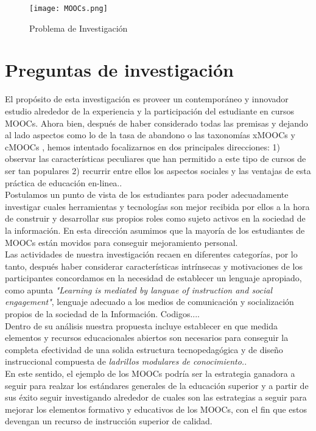\documentclass[10pt]{article}
\begin{document}
\vspace{10pt}

\begin{figure}[ht]\centering %
\texttt{[image: MOOCs.png]}
\caption{Problema de Investigación}
\label{fig:MOOCs.jpg}
\end{figure}

\section{Preguntas de investigación}

El propósito de esta investigación es proveer un contemporáneo y innovador estudio alrededor de la experiencia y la participación del estudiante en cursos MOOCs. Ahora bien, después de haber considerado todas las premisas y dejando al lado aspectos como lo de la tasa de abandono o las taxonomías xMOOCs y cMOOCs \citep{alt15}, hemos intentado focalizarnos en dos principales direcciones: 1) observar las características peculiares que han permitido a este tipo de cursos de ser tan populares 2) recurrir entre ellos los aspectos sociales y las ventajas de esta práctica de educación en-linea.\citep{jcAF17}.
\\ Postulamos un punto de vista de los estudiantes\citep{GuardiaOrtiz2013} para poder adecuadamente investigar cuales herramientas y tecnologías son mejor recibida por ellos a la hora de construir y desarrollar sus propios roles como sujeto activos en la sociedad de la información. En esta dirección asumimos que la mayoría de los estudiantes de MOOCs están movidos para conseguir mejoramiento  personal.\citep{Nrb17}
\\Las actividades de nuestra investigación recaen en diferentes categorías, por lo tanto, después haber considerar características intrínsecas y motivaciones de los participantes concordamos en la necesidad de establecer un lenguaje apropiado, como apunta \citep{cae16} \textit{"Learning is mediated by languae of instruction and social engagement"}, lenguaje adecuado a los medios de comunicación y socialización propios de la sociedad de la Información. Codigos....
\\ Dentro de su análisis nuestra propuesta incluye  establecer en que medida  elementos y recursos educacionales abiertos son necesarios para conseguir la completa efectividad de una solida estructura tecnopedagógica y de diseño instruccional compuesta de \textit{ladrillos modulares de conocimiento.}\citep{Dow05}.
\\ En este sentido, el ejemplo de los MOOCs podría ser la estrategia ganadora a seguir para realzar los estándares generales de la educación superior y a partir de sus éxito seguir investigando alrededor de cuales son las estrategias a seguir  para mejorar los  elementos formativo y educativos de los MOOCs, con el fin que estos devengan un recurso de instrucción superior de calidad.\cite{GuardiaOrtiz2013}
\end{document}
